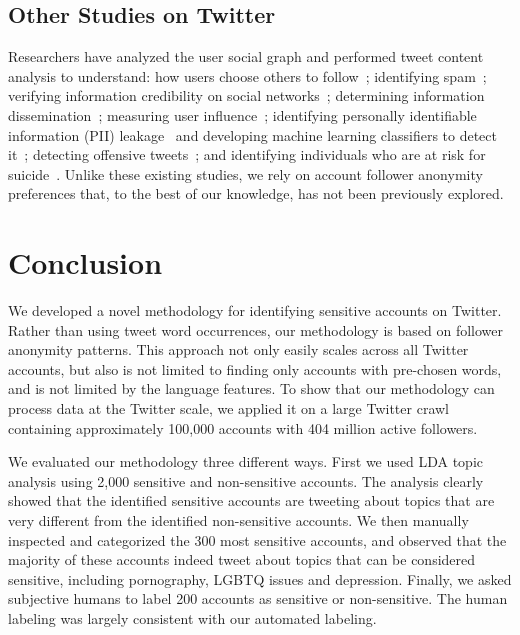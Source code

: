 \documentclass[conference]{IEEEtran}
\begin{document}
\subsection{Other Studies on Twitter}
Researchers have analyzed the user social graph and performed tweet content analysis to understand: how users choose others to follow~\cite{Java2007}; identifying spam~\cite{twitterspamcharacterization,twitterspamsuspendedaccounts}; verifying  information credibility on social networks~\cite{Castillo2011}; 
determining information dissemination~\cite{twittersocialmedia}; 
measuring user influence~\cite{cha2010measuring}; identifying personally  identifiable information (PII) leakage~\cite{humphreys2010much} and developing machine learning classifiers to detect it~\cite{loosetweets}; detecting offensive tweets~\cite{offensivetweets}; and identifying individuals who are at risk for suicide~\cite{twittersuicidetracking}.
Unlike these existing studies, 
we rely on account follower anonymity preferences that, to the best of our knowledge, has not been previously explored.



\section{Conclusion}
\label{sec:conclusion}
We developed a novel methodology for identifying sensitive accounts on Twitter. Rather than using tweet word occurrences, our methodology is based on follower anonymity patterns. This approach not only easily scales across all Twitter accounts, but also is not limited to finding only accounts with pre-chosen words, and is not limited by the language features. To show that our methodology can process data at the Twitter scale, we applied it on a large Twitter crawl containing approximately 100,000 accounts with 404 million active followers.  

We evaluated our methodology three different ways. First we used LDA topic analysis using 2,000 sensitive and non-sensitive accounts.
The analysis clearly showed that  the identified sensitive accounts are tweeting about topics that are very different from the identified non-sensitive accounts. We then manually inspected and categorized the 300 most sensitive accounts, and observed that the majority of these accounts indeed tweet about topics that can be considered sensitive, including pornography, LGBTQ issues and depression. Finally, we asked subjective humans to label 200 accounts as sensitive or non-sensitive. The human labeling was largely consistent with our automated labeling.
\end{document}
